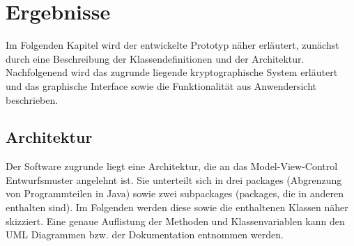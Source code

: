 \documentclass[13pt,a4paper,bibliography=totocnumbered,listof=totocnumbered]{scrartcl}
\begin{document}
\pagebreak


\section{Ergebnisse}\label{ErgebnisseV}
Im Folgenden Kapitel wird der entwickelte Prototyp näher erläutert, zunächst durch eine Beschreibung der Klassendefinitionen und der Architektur. Nachfolgenend wird das zugrunde liegende kryptographische System erläutert und das graphische Interface sowie die Funktionalität aus Anwendersicht beschrieben.

\subsection{Architektur}
Der Software zugrunde liegt eine Architektur, die an das Model-View-Control Entwurfsmuster angelehnt ist. Sie unterteilt sich in drei packages (Abgrenzung von Programmteilen in Java) sowie zwei subpackages (packages, die in anderen enthalten sind). Im Folgenden werden diese sowie die enthaltenen Klassen näher skizziert. Eine genaue Auflistung der Methoden und Klassenvariablen kann den UML Diagrammen bzw. der Dokumentation entnommen werden.
\end{document}
